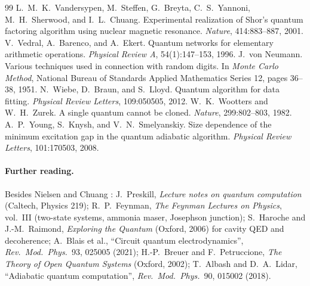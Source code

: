 \begin{thebibliography}{99}
 L.~M.~K.~Vandersypen, M.~Steffen, G.~Breyta, C.~S.~Yannoni, M.~H.~Sherwood, and I.~L.~Chuang. Experimental realization of Shor's quantum factoring algorithm using nuclear magnetic resonance. \emph{Nature}, 414:883--887, 2001.
 V.~Vedral, A.~Barenco, and A.~Ekert. Quantum networks for elementary arithmetic operations. \emph{Physical Review A}, 54(1):147--153, 1996.
 J.~von Neumann. Various techniques used in connection with random digits. In \emph{Monte Carlo Method}, National Bureau of Standards Applied Mathematics Series 12, pages 36--38, 1951.
 N.~Wiebe, D.~Braun, and S.~Lloyd. Quantum algorithm for data fitting. \emph{Physical Review Letters}, 109:050505, 2012.
 W.~K.~Wootters and W.~H.~Zurek. A single quantum cannot be cloned. \emph{Nature}, 299:802--803, 1982.
 A.~P.~Young, S.~Knysh, and V.~N.~Smelyanskiy. Size dependence of the minimum excitation gap in the quantum adiabatic algorithm. \emph{Physical Review Letters}, 101:170503, 2008.

\paragraph{Further reading.} Besides Nielsen and Chuang \cite{NielsenChuang}: J.~Preskill, \emph{Lecture notes on quantum computation} (Caltech, Physics 219); R.~P.~Feynman, \emph{The Feynman Lectures on Physics}, vol.~III (two-state systems, ammonia maser, Josephson junction);
S.~Haroche and J.-M.~Raimond, \emph{Exploring the Quantum} (Oxford, 2006) for cavity QED and decoherence; A.~Blais et al., ``Circuit quantum electrodynamics'', \emph{Rev.\ Mod.\ Phys.}\ 93, 025005 (2021); H.-P.~Breuer and F.~Petruccione,
\emph{The Theory of Open Quantum Systems} (Oxford, 2002); T.~Albash and D.~A.~Lidar, ``Adiabatic quantum computation'', \emph{Rev.\ Mod.\ Phys.}\ 90, 015002 (2018).
\end{thebibliography}
